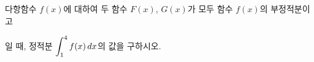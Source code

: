 다항함수 $f(x)$에 대하여 두 함수 $F(x)$, $G(x)$가 모두 함수 $f(x)$의 부정적분이고 \par\smallskip{}\par\smallskip\noindent 일 때, 정적분 $\displaystyle\int_{1}^{4}f(x)\mkern3mu dx$의 값을 구하시오.
